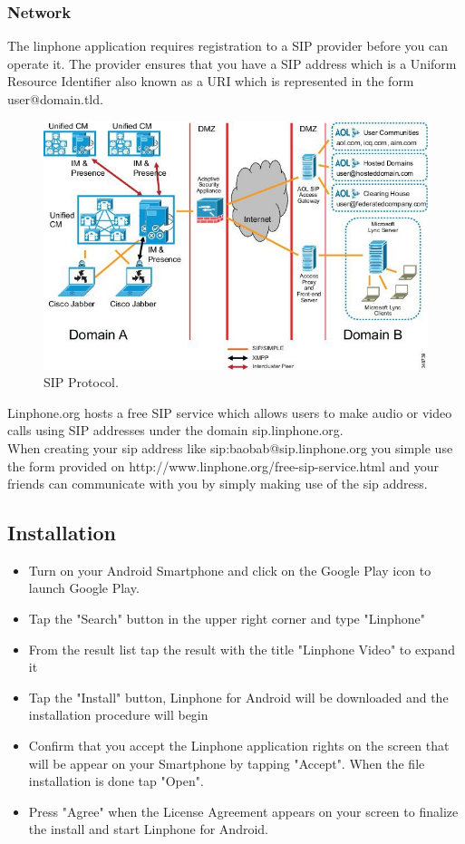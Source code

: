 \documentclass[a4paper]{article}
\begin{document}
\subsubsection{Network}
The linphone application requires registration to a SIP provider before you can operate it. The provider ensures that you have a SIP address which is a Uniform Resource Identifier also known as a URI which is represented in the form user@domain.tld. \\


\begin{center}
\begin{figure}[h]
\centering
\includegraphics[width=0.7\linewidth]{./pictures/sip.jpg}
\caption{\label{fig:Agile}SIP Protocol.}
\end{figure}
\end{center}
Linphone.org hosts a free SIP service which allows users to make audio or video calls using SIP addresses under the domain sip.linphone.org. \\
When creating your sip address like sip:baobab@sip.linphone.org you simple use the form provided on http://www.linphone.org/free-sip-service.html and your friends can communicate with you by simply making use of the sip address.


\subsection{Installation}
\begin{itemize}
\item Turn on your Android Smartphone and click on the Google Play icon to launch Google Play.
\item Tap the "Search" button in the upper right corner and type "Linphone"
\item From the result list tap the result with the title "Linphone Video" to expand it
\item Tap the "Install" button, Linphone for Android will be downloaded and the installation procedure will begin
\item Confirm that you accept the Linphone application rights on the screen that will be appear on your Smartphone by tapping "Accept". When the file installation is done tap "Open".
\item Press "Agree" when the License Agreement appears on your screen to finalize the install and start Linphone for Android.
\end{itemize}
\end{document}
